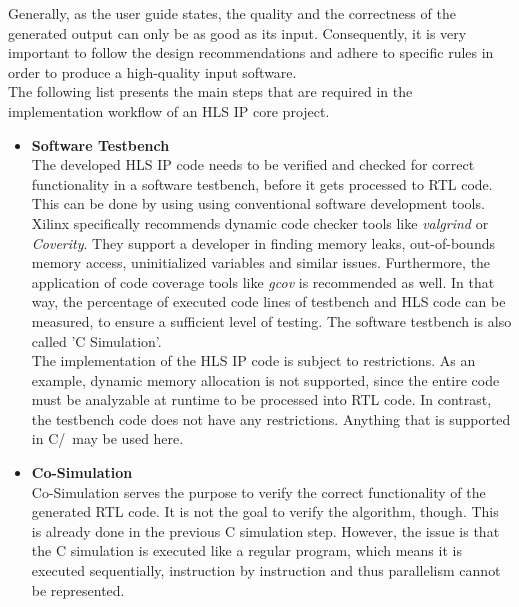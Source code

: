 Generally, as the user guide states, the quality and the correctness of the generated output can only be as good as its input.
Consequently, it is very important to follow the design recommendations and adhere to specific rules in order to produce a high-quality input software.\\

The following list presents the main steps that are required in the implementation workflow of an HLS IP core project.\\

\begin{itemize}
  \item \textbf{Software Testbench}\\
      The developed HLS IP code needs to be verified and checked for correct functionality in a software testbench, before it gets processed to RTL code.
      This can be done by using using conventional software development tools.
      Xilinx specifically recommends dynamic code checker tools like \textit{valgrind} or \textit{Coverity}.
      They support a developer in finding memory leaks, out-of-bounds memory access, uninitialized variables and similar issues.
      Furthermore, the application of code coverage tools like \textit{gcov} is recommended as well.
      In that way, the percentage of executed code lines of testbench and HLS code can be measured, to ensure a sufficient level of testing.
      The software testbench is also called 'C Simulation'.\\

      The implementation of the HLS IP code is subject to restrictions.
      As an example, dynamic memory allocation is not supported, since the entire code must be analyzable at runtime to be processed into RTL code.
      In contrast, the testbench code does not have any restrictions.
      Anything that is supported in C/\cplusplus\ may be used here.\\

  \item \textbf{Co-Simulation}\\
      Co-Simulation serves the purpose to verify the correct functionality of the generated RTL code.
      It is not the goal to verify the algorithm, though.
      This is already done in the previous C simulation step.
      However, the issue is that the C simulation is executed like a regular program, which means it is executed sequentially, instruction by instruction and thus parallelism cannot be represented.\\


\end{itemize}

